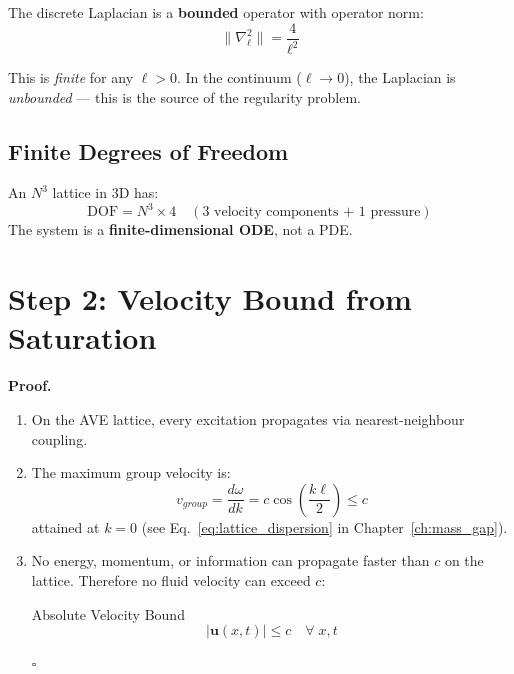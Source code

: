 The discrete Laplacian is a \textbf{bounded} operator with operator
norm:
\begin{equation}
    \| \nabla^2_{\ell} \| = \frac{4}{\ell^2}
    \label{eq:laplacian_norm}
\end{equation}

This is \textit{finite} for any $\ell > 0$.  In the continuum
($\ell \to 0$), the Laplacian is \textit{unbounded} --- this is the
source of the regularity problem.

\subsection{Finite Degrees of Freedom}

An $N^3$ lattice in 3D has:
\begin{equation}
    \text{DOF} = N^3 \times 4
    \quad (\text{3 velocity components + 1 pressure})
\end{equation}
The system is a \textbf{finite-dimensional ODE}, not a PDE.

\section{Step 2: Velocity Bound from Saturation}
\label{sec:ns_velocity_bound}

\noindent{}

\medskip\noindent
\textbf{Proof.}
\begin{enumerate}
    \item On the AVE lattice, every excitation propagates via
    nearest-neighbour coupling.

    \item The maximum group velocity is:
    \begin{equation}
        v_{group} = \frac{d\omega}{dk}
        = c\cos\!\left(\frac{k\ell}{2}\right)
        \le c
    \end{equation}
    attained at $k = 0$ (see Eq.~\ref{eq:lattice_dispersion} in
    Chapter~\ref{ch:mass_gap}).

    \item No energy, momentum, or information can propagate faster
    than $c$ on the lattice.  Therefore no fluid velocity can exceed $c$:
    \begin{resultbox}{Absolute Velocity Bound}
    \begin{equation}
        |\mathbf{u}(x,t)| \le c \quad \forall\; x, t
    \end{equation}
    \end{resultbox}
    \hfill$\square$
\end{enumerate}

